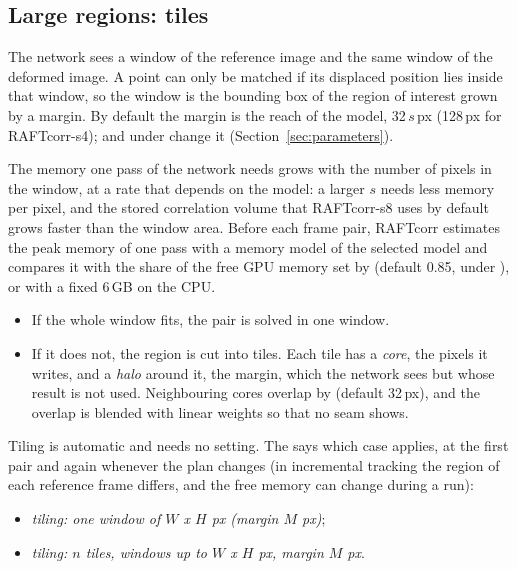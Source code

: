 \subsection{Large regions: tiles}
\label{sec:tiling}

The network sees a window of the reference image and the same window of the deformed image. A
point can only be matched if its displaced position lies inside that window, so the window is
the bounding box of the region of interest grown by a margin. By default the margin is the reach
of the model, 32\,$s$\,px (128\,px for RAFTcorr-s4);  and 
under  change it (Section~\ref{sec:parameters}).

The memory one pass of the network needs grows with the number of pixels in the window, at a
rate that depends on the model: a larger $s$ needs less memory per pixel, and the stored
correlation volume that RAFTcorr-s8 uses by default grows faster than the window area. Before
each frame pair, RAFTcorr estimates the peak memory of one pass with a memory model of the
selected model and compares it with the share of the free GPU memory set by 
(default 0.85, under ), or with a fixed 6\,GB on the CPU.

\begin{itemize}
  \item If the whole window fits, the pair is solved in one window.
  \item If it does not, the region is cut into tiles. Each tile has a \emph{core}, the pixels it
        writes, and a \emph{halo} around it, the margin, which the network sees but whose result
        is not used. Neighbouring cores overlap by  (default 32\,px), and the
        overlap is blended with linear weights so that no seam shows.
\end{itemize}

Tiling is automatic and needs no setting. The  says which case applies, at the first pair
and again whenever the plan changes (in incremental tracking the region of each reference frame
differs, and the free memory can change during a run):

\begin{itemize}
  \item \emph{tiling: one window of $W$ x $H$ px (margin $M$ px)};
  \item \emph{tiling: $n$ tiles, windows up to $W$ x $H$ px, margin $M$ px}.
\end{itemize}

